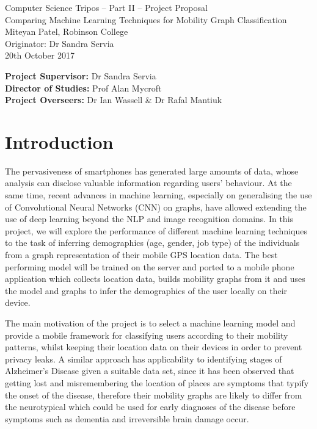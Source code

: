 \documentclass[12pt,a4paper,twoside]{article}
\begin{document}
\begin{center}
\Large
Computer Science Tripos -- Part II -- Project Proposal\\[4mm]
\LARGE
Comparing Machine Learning Techniques for Mobility Graph Classification\\[4mm]
\large
Miteyan Patel, Robinson College\\
Originator: Dr Sandra Servia\\
20th October 2017
\end{center}
\vspace{5mm}
\textbf{Project Supervisor:} Dr Sandra Servia\\
\textbf{Director of Studies:} Prof Alan Mycroft\\
\textbf{Project Overseers:} Dr Ian Wassell \& Dr Rafal Mantiuk
\section*{Introduction}
The pervasiveness of smartphones has generated large amounts of data, whose analysis can disclose valuable information regarding users' behaviour. At the same time, recent advances in machine learning, especially on generalising the use of Convolutional Neural Networks (CNN) on graphs, have allowed extending the use of deep learning beyond the NLP and image recognition domains. In this project, we will explore the performance of different machine learning techniques to the task of inferring demographics (age, gender, job type) of the individuals from a graph representation of their mobile GPS location data. The best performing model will be trained on the server and ported to a mobile phone application which collects location data, builds mobility graphs from it and uses the model and graphs to infer the demographics of the user locally on their device. 

The main motivation of the project is to select a machine learning model and provide a mobile framework for classifying users according to their mobility patterns, whilst keeping their location data on their devices in order to prevent privacy leaks. A similar approach has applicability to identifying stages of Alzheimer's Disease given a suitable data set, since it has been observed that getting lost and misremembering the location of places are symptoms that typify the onset of the disease, therefore their mobility graphs are likely to differ from the neurotypical which could be used for early diagnoses of the disease before symptoms such as dementia and irreversible brain damage occur.
\end{document}
